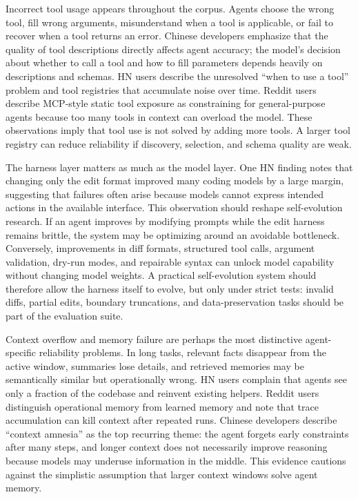 Incorrect tool usage appears throughout the corpus. Agents choose the wrong tool, fill wrong arguments, misunderstand when a tool is applicable, or fail to recover when a tool returns an error. Chinese developers emphasize that the quality of tool descriptions directly affects agent accuracy; the model's decision about whether to call a tool and how to fill parameters depends heavily on descriptions and schemas. HN users describe the unresolved ``when to use a tool'' problem and tool registries that accumulate noise over time. Reddit users describe MCP-style static tool exposure as constraining for general-purpose agents because too many tools in context can overload the model. These observations imply that tool use is not solved by adding more tools. A larger tool registry can reduce reliability if discovery, selection, and schema quality are weak.

The harness layer matters as much as the model layer. One HN finding notes that changing only the edit format improved many coding models by a large margin, suggesting that failures often arise because models cannot express intended actions in the available interface. This observation should reshape self-evolution research. If an agent improves by modifying prompts while the edit harness remains brittle, the system may be optimizing around an avoidable bottleneck. Conversely, improvements in diff formats, structured tool calls, argument validation, dry-run modes, and repairable syntax can unlock model capability without changing model weights. A practical self-evolution system should therefore allow the harness itself to evolve, but only under strict tests: invalid diffs, partial edits, boundary truncations, and data-preservation tasks should be part of the evaluation suite.

Context overflow and memory failure are perhaps the most distinctive agent-specific reliability problems. In long tasks, relevant facts disappear from the active window, summaries lose details, and retrieved memories may be semantically similar but operationally wrong. HN users complain that agents see only a fraction of the codebase and reinvent existing helpers. Reddit users distinguish operational memory from learned memory and note that trace accumulation can kill context after repeated runs. Chinese developers describe ``context amnesia'' as the top recurring theme: the agent forgets early constraints after many steps, and longer context does not necessarily improve reasoning because models may underuse information in the middle. This evidence cautions against the simplistic assumption that larger context windows solve agent memory.

